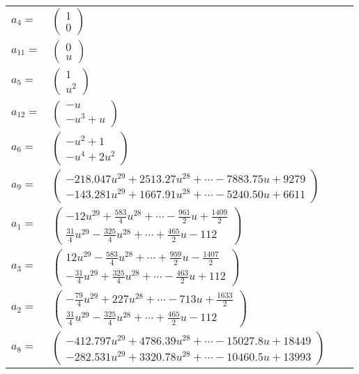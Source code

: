 \documentclass[1p]{elsarticle_modified}
\theoremstyle{definition}
\begin{document}
\begin{tabular}{m{7pt} m{180pt} m{7pt} m{180pt} }
\flushright $a_{4}=$&$\begin{pmatrix}1\\0\end{pmatrix}$ \\
\flushright $a_{11}=$&$\begin{pmatrix}0\\u\end{pmatrix}$ \\
\flushright $a_{5}=$&$\begin{pmatrix}1\\u^2\end{pmatrix}$ \\
\flushright $a_{12}=$&$\begin{pmatrix}- u\\- u^3+u\end{pmatrix}$ \\
\flushright $a_{6}=$&$\begin{pmatrix}- u^2+1\\- u^4+2 u^2\end{pmatrix}$ \\
\flushright $a_{9}=$&$\begin{pmatrix}-218.047 u^{29}+2513.27 u^{28}+\cdots-7883.75 u+9279\\-143.281 u^{29}+1667.91 u^{28}+\cdots-5240.50 u+6611\end{pmatrix}$ \\
\flushright $a_{1}=$&$\begin{pmatrix}-12 u^{29}+\frac{583}{4} u^{28}+\cdots-\frac{961}{2} u+\frac{1409}{2}\\\frac{31}{4} u^{29}-\frac{325}{4} u^{28}+\cdots+\frac{465}{2} u-112\end{pmatrix}$ \\
\flushright $a_{3}=$&$\begin{pmatrix}12 u^{29}-\frac{583}{4} u^{28}+\cdots+\frac{959}{2} u-\frac{1407}{2}\\-\frac{31}{4} u^{29}+\frac{325}{4} u^{28}+\cdots-\frac{463}{2} u+112\end{pmatrix}$ \\
\flushright $a_{2}=$&$\begin{pmatrix}-\frac{79}{4} u^{29}+227 u^{28}+\cdots-713 u+\frac{1633}{2}\\\frac{31}{4} u^{29}-\frac{325}{4} u^{28}+\cdots+\frac{465}{2} u-112\end{pmatrix}$ \\
\flushright $a_{8}=$&$\begin{pmatrix}-412.797 u^{29}+4786.39 u^{28}+\cdots-15027.8 u+18449\\-282.531 u^{29}+3320.78 u^{28}+\cdots-10460.5 u+13993\end{pmatrix}$ \\

\end{tabular}
\end{document}
